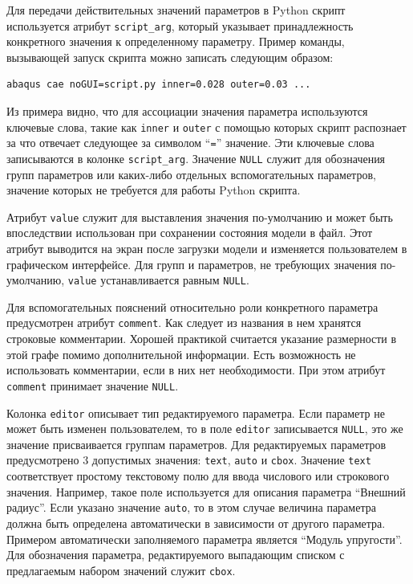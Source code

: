 \documentclass[14pt,oneside,final]{extreport}
\begin{document}
	Для передачи действительных значений параметров в Python скрипт используется атрибут \texttt{script\_arg}, который указывает принадлежность конкретного значения к определенному параметру. Пример команды, вызывающей запуск скрипта можно записать следующим образом: \begin{verbatim}abaqus cae noGUI=script.py inner=0.028 outer=0.03 ... \end{verbatim}	
	Из примера видно, что для ассоциации значения параметра используются ключевые слова, такие как \texttt{inner} и \texttt{outer} с помощью которых скрипт распознает за что отвечает следующее за символом ``\texttt{=}'' значение. Эти ключевые слова записываются в колонке  \texttt{script\_arg}. Значение \texttt{NULL} служит для обозначения групп параметров или каких-либо отдельных вспомогательных параметров, значение которых не требуется для работы Python скрипта.

	Атрибут \texttt{value} служит для выставления значения по-умолчанию и может быть впоследствии использован при сохранении состояния модели в файл. Этот атрибут выводится на экран после загрузки модели и изменяется пользователем в графическом интерфейсе. Для групп и параметров, не требующих значения по-умолчанию, \texttt{value} устанавливается равным \texttt{NULL}. 

	Для вспомогательных пояснений относительно роли конкретного параметра предусмотрен атрибут \texttt{comment}. Как следует из названия в нем хранятся строковые комментарии. Хорошей практикой считается указание размерности в этой графе помимо дополнительной информации. Есть возможность не использовать комментарии, если в них нет необходимости. При этом атрибут  \texttt{comment} принимает значение \texttt{NULL}. 
	
	Колонка \texttt{editor} описывает тип редактируемого параметра. Если параметр не может быть изменен пользователем, то в поле \texttt{editor} записывается \texttt{NULL}, это же значение присваивается группам параметров. Для редактируемых параметров предусмотрено 3 допустимых значения: \texttt{text}, \texttt{auto} и \texttt{cbox}. Значение \texttt{text} соответствует простому текстовому полю для ввода числового или строкового значения. Например, такое поле используется для описания параметра ``Внешний радиус''. Если указано значение \texttt{auto}, то в этом случае величина параметра должна быть определена автоматически в зависимости от другого параметра. Примером автоматически заполняемого параметра является ``Модуль упругости''. Для обозначения параметра, редактируемого выпадающим списком с предлагаемым набором значений служит \texttt{cbox}.
\end{document}
